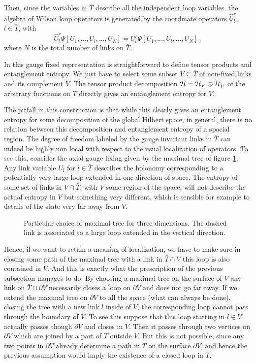 \documentclass[12pt,a4paper]{article}
\newcommand{\be}{\begin{equation}}
\newcommand{\ee}{\end{equation}}
\def\be{\begin{equation}}
\def\ee{\end{equation}}
\begin{document}
Then, since the variables in $\bar{T}$ describe all the independent loop variables, the algebra of Wilson loop operators is generated 
by the coordinate operators $\hat{U}_l^r$, $l\in \bar{T}$, with
\be
\hat{U}_l^{r} \Psi[U_1,..., U_l,...,U_N]=U_l^{r} \Psi[U_1,..., U_l,...,U_N]\,,
\ee     
where $N$ is the total number of links on $\bar{T}$. 




In this gauge fixed representation is straightforward to define tensor products and entanglement entropy. We just have to select some 
subset $V\subseteq \bar{T}$ of non-fixed links and its complement $\bar{V}$. The tensor product 
decomposition ${\cal H}={\cal H}_V\otimes {\cal H}_{\bar V}$ of the arbitrary functions on $\bar{T}$ directly gives an entanglement entropy for $V$. 

The pitfall in this construction is that while this clearly gives an entanglement entropy for some decomposition of the global 
Hilbert space, in general, there is no relation between this decomposition and entanglement entropy of a spacial region. The degree 
of freedom labeled by the gauge invariant links in $\bar{T}$ can indeed be highly non local with respect to the usual localization of 
operators. To see this, consider the axial gauge fixing given by the maximal tree of figure \ref{axial}. Any link variable $U_l$ for $l\in \bar{T}$ 
describes the holonomy corresponding to a potentially very large loop extended in one direction of space. The entropy of some set of 
links in $V\cap \bar{T}$, with $V$ some region of the space, will not describe the actual entropy in $V$ but something very different, 
which is sensible for example to details of the state very far away from $V$.   

\begin{figure}
\centering
\leavevmode
\epsfysize=5cm
\bigskip
\caption{Particular choice of maximal tree for three dimensions. The dashed link is 
associated to a large loop extended in the vertical direction. }
\label{axial}
\end{figure}


Hence, if we want to retain a meaning of localization, we have to make sure in closing some path of the maximal tree with a link 
in $\bar{T}\cap V$ this loop is also contained in $V$. And this is exactly what the prescription of the previous subsection manages 
to do. By choosing a maximal tree on the surface of $V$ any link on $\bar{T}\cap \partial V$ necessarily closes a loop on $\partial V$ 
and does not go far away. If we extend the maximal tree on $\partial V$ to all the space (what can always be done), closing the tree 
with a new link $l$ inside of $V$, the corresponding loop cannot pass through the boundary of $V$. To see this suppose that this loop 
starting in $l\in V$ actually passes though $\partial V$ and closes in $\bar{V}$. Then it passes through two vertices on $\partial V$ 
which are joined by a part of $T$ outside $V$. But this is not possible, since any two points in $\partial V$ already determine a path 
in $T$ on the surface $\partial V$, and hence the previous assumption would imply the existence of a closed loop in $T$. 
\end{document}
